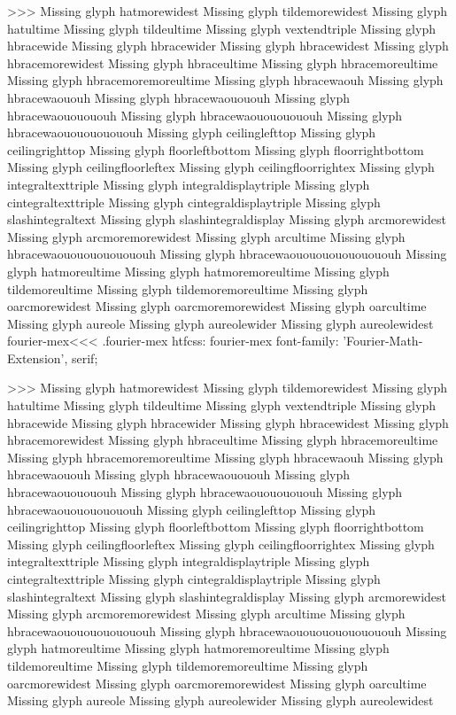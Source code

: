 {>>>
Missing glyph	hatmorewidest
Missing glyph	tildemorewidest
Missing glyph	hatultime
Missing glyph	tildeultime
Missing glyph	vextendtriple
Missing glyph	hbracewide
Missing glyph	hbracewider
Missing glyph	hbracewidest
Missing glyph	hbracemorewidest
Missing glyph	hbraceultime
Missing glyph	hbracemoreultime
Missing glyph	hbracemoremoreultime
Missing glyph	hbracewaouh
Missing glyph	hbracewaououh
Missing glyph	hbracewaouououh
Missing glyph	hbracewaououououh
Missing glyph	hbracewaouououououh
Missing glyph	hbracewaououououououh
Missing glyph	ceilinglefttop
Missing glyph	ceilingrighttop
Missing glyph	floorleftbottom
Missing glyph	floorrightbottom
Missing glyph	ceilingfloorleftex
Missing glyph	ceilingfloorrightex
Missing glyph	integraltexttriple
Missing glyph	integraldisplaytriple
Missing glyph	cintegraltexttriple
Missing glyph	cintegraldisplaytriple
Missing glyph	slashintegraltext
Missing glyph	slashintegraldisplay
Missing glyph	arcmorewidest
Missing glyph	arcmoremorewidest
Missing glyph	arcultime
Missing glyph	hbracewaouououououououh
Missing glyph	hbracewaououououououououh
Missing glyph	hatmoreultime
Missing glyph	hatmoremoreultime
Missing glyph	tildemoreultime
Missing glyph	tildemoremoreultime
Missing glyph	oarcmorewidest
Missing glyph	oarcmoremorewidest
Missing glyph	oarcultime
Missing glyph	aureole
Missing glyph	aureolewider
Missing glyph	aureolewidest
\<fourier-mex\><<<
.fourier-mex
htfcss:  fourier-mex  font-family: 'Fourier-Math-Extension', serif;

>>>
Missing glyph	hatmorewidest
Missing glyph	tildemorewidest
Missing glyph	hatultime
Missing glyph	tildeultime
Missing glyph	vextendtriple
Missing glyph	hbracewide
Missing glyph	hbracewider
Missing glyph	hbracewidest
Missing glyph	hbracemorewidest
Missing glyph	hbraceultime
Missing glyph	hbracemoreultime
Missing glyph	hbracemoremoreultime
Missing glyph	hbracewaouh
Missing glyph	hbracewaououh
Missing glyph	hbracewaouououh
Missing glyph	hbracewaououououh
Missing glyph	hbracewaouououououh
Missing glyph	hbracewaououououououh
Missing glyph	ceilinglefttop
Missing glyph	ceilingrighttop
Missing glyph	floorleftbottom
Missing glyph	floorrightbottom
Missing glyph	ceilingfloorleftex
Missing glyph	ceilingfloorrightex
Missing glyph	integraltexttriple
Missing glyph	integraldisplaytriple
Missing glyph	cintegraltexttriple
Missing glyph	cintegraldisplaytriple
Missing glyph	slashintegraltext
Missing glyph	slashintegraldisplay
Missing glyph	arcmorewidest
Missing glyph	arcmoremorewidest
Missing glyph	arcultime
Missing glyph	hbracewaouououououououh
Missing glyph	hbracewaououououououououh
Missing glyph	hatmoreultime
Missing glyph	hatmoremoreultime
Missing glyph	tildemoreultime
Missing glyph	tildemoremoreultime
Missing glyph	oarcmorewidest
Missing glyph	oarcmoremorewidest
Missing glyph	oarcultime
Missing glyph	aureole
Missing glyph	aureolewider
Missing glyph	aureolewidest

}
